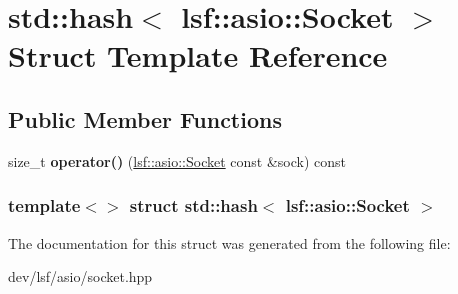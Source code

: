 \hypertarget{structstd_1_1hash_3_01lsf_1_1asio_1_1Socket_01_4}{
\section{std::hash$<$ lsf::asio::Socket $>$ Struct Template Reference}
\label{structstd_1_1hash_3_01lsf_1_1asio_1_1Socket_01_4}
}
\subsection*{Public Member Functions}
\begin{DoxyCompactItemize}
\item 
\hypertarget{structstd_1_1hash_3_01lsf_1_1asio_1_1Socket_01_4_a70c3d8ee09ed782151442dcc7487bcc8}{
size\_\-t {\bfseries operator()} (\hyperlink{classlsf_1_1asio_1_1Socket}{lsf::asio::Socket} const \&sock) const }
\label{structstd_1_1hash_3_01lsf_1_1asio_1_1Socket_01_4_a70c3d8ee09ed782151442dcc7487bcc8}

\end{DoxyCompactItemize}
\subsubsection*{template$<$$>$ struct std::hash$<$ lsf::asio::Socket $>$}



The documentation for this struct was generated from the following file:\begin{DoxyCompactItemize}
\item 
dev/lsf/asio/socket.hpp\end{DoxyCompactItemize}
